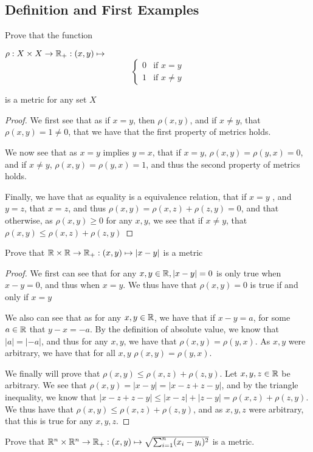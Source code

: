 \subsection{Definition and First Examples}

\begin{majorEx}%
  Prove that the function
  \begin{center}
  $\rho : X \times X \rightarrow \mathbb{R}_+ : (x,y) \mapsto $
  \[ \begin{cases} 
    0 & \text{if } x=y \\
    1 & \text{if } x \neq y 
  \end{cases}
  \]
\end{center}
\end{majorEx}
is a metric for any set $X$
\begin{proof}
   We first see that as if $x=y$, then $\rho(x,y)$, and if $x\neq y$, that $\rho(x,y)=1\neq 0$, that we have that the first property of metrics holds.

   We now see that as $x=y$ implies $y=x$, that if $x=y$, 
   $\rho(x,y)=\rho(y,x)=0$, and if $x\neq y$, $\rho(x,y)=\rho(y,x)=1$, and thus the 
   second property of metrics holds.

   Finally, we have that as equality is a equivalence relation, that if $x=y$ , and $y=z$, 
   that $x=z$, and thus $\rho(x,y) = \rho(x,z)+ \rho(z,y)=0$, and that otherwise, as $\rho(x,y)\geq 0$ for any $x,y$, we see that if $x\neq y$, that $\rho(x,y) \leq \rho(x,z)+ \rho(z,y)$   
\end{proof}  
  

\begin{majorEx} %
  Prove that $\mathbb{R} \times \mathbb{R} \rightarrow  \mathbb{R}_+ : (x,y) \mapsto |x-y|$ is a metric
\end{majorEx}

\begin{proof}
  We first can see that for any $x,y \in \mathbb{R}, |x-y|=0$ is only true when $x-y=0$, and thus
  when $x=y$. We thus have that $\rho(x,y)=0$ is true if and only if $x=y$
  
  We also can see that as for any $x,y\in \mathbb{R}$, we have that if
  $x-y=a$, for some $a\in \mathbb{R}$ that  $y-x={-a}$. By the definition of
  absolute value, we know that $|a| = |{-a}|$, and thus for any $x,y$,
  we have that $\rho(x,y) = \rho(y,x)$. As $x,y$ were arbitrary, we
  have that for all $x,y$ $\rho(x,y) = \rho(y,x)$.

  We finally will prove that $\rho(x,y) \leq \rho(x,z) + \rho(z,y)$.
  Let $x,y,z \in \mathbb{R}$ be arbitrary. We see that $\rho(x,y)= |x-y| = |x-z+z-y|$,
  and by the triangle inequality, we know that $|x-z+z-y|\leq |x-z| +
  |z-y|=\rho(x,z)+ \rho(z,y)$. We thus have that $\rho(x,y) \leq
  \rho(x,z) + \rho(z,y)$, and as $x,y,z$ were arbitrary, that this is
  true for any $x,y,z$.
\end{proof}

\begin{majorEx}
    Prove that $\mathbb{R}^n \times \mathbb{R}^n \to \mathbb{R}_+ : (x,y) \mapsto
    \sqrt{\sum_{i=1}^{n}(x_i - y_i)^2}$ is a metric.
\end{majorEx}

